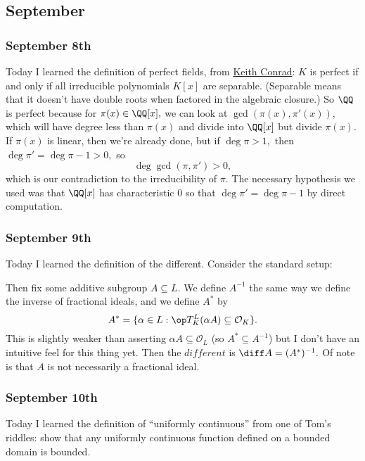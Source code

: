 \subsection{September}

\subsubsection{September 8th}
Today I learned the definition of perfect fields, from \href{https://kconrad.math.uconn.edu/blurbs/galoistheory/perfect.pdf}{Keith Conrad}: $K$ is perfect if and only if all irreducible polynomials $K[x]$ are separable. (Separable means that it doesn't have double roots when factored in the algebraic closure.) So $\QQ$ is perfect because for $\pi(x)\in\QQ[x],$ we can look at $\gcd(\pi(x),\pi'(x)),$ which will have degree less than $\pi(x)$ and divide into $\QQ[x]$ but divide $\pi(x).$ If $\pi(x)$ is linear, then we're already done, but if $\deg\pi>1,$ then $\deg\pi'=\deg\pi-1>0,$ so
\[\deg\gcd(\pi,\pi')>0,\]
which is our contradiction to the irreducibility of $\pi.$ The necessary hypothesis we used was that $\QQ[x]$ has characteristic $0$ so that $\deg\pi'=\deg\pi-1$ by direct computation.

\subsubsection{September 9th}
Today I learned the definition of the different. Consider the standard setup:
\begin{center}
\end{center}
Then fix some additive subgroup $A\subseteq L.$ We define $A^{-1}$ the same way we define the inverse of fractional ideals, and we define $A^*$ by
\[A^*=\{\alpha\in L:\op T_K^L(\alpha A)\subseteq\mathcal O_K\}.\]
This is slightly weaker than asserting $\alpha A\subseteq\mathcal O_L$ (so $A^*\subseteq A^{-1}$) but I don't have an intuitive feel for this thing yet. Then the $\textit{different}$ is $\diff A=(A^*)^{-1}.$ Of note is that $A$ is not necessarily a fractional ideal.

\subsubsection{September 10th}
Today I learned the definition of ``uniformly continuous'' from one of Tom's riddles: show that any uniformly continuous function defined on a bounded domain is bounded.


